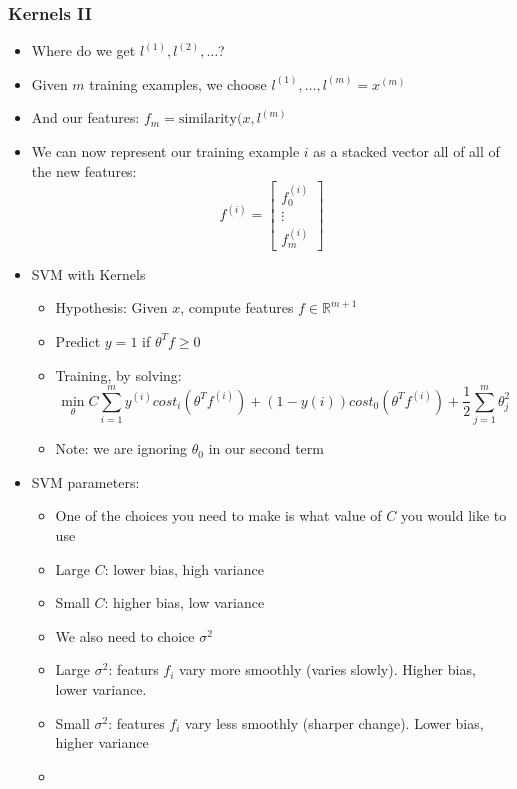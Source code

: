 \subsubsection{Kernels II}
\begin{itemize}[--]
	\item Where do we get $l^{(1)}, l^{(2)}, \ldots$?
	\item Given $m$ training examples, we choose $l^{(1)}, \ldots, l^{(m)}=x^{(m)}$
	\item And our features: $f_m=\text{similarity}(x, l^{(m)}$
	\item We can now represent our training example $i$ as a stacked vector all of all of the new features: 
		$$f^{(i)}=\begin{bmatrix}
			f_0^{(i)}\\
			\vdots \\
			f_m^{(i)}
		\end{bmatrix}$$

	\item SVM with Kernels
	\begin{itemize}[--]
		\item Hypothesis: Given $x$, compute features $f\in\mathbb{R}^{m+1}$
		\item Predict $y=1$ if $\theta^{T}f\geq 0$
		\item Training, by solving:
			$$\min_{\theta} C\sum_{i=1}^{m}y^{(i)}cost_i (\theta^{T}f^{(i)}) + (1-y{(i)})cost_0 (\theta^{T}f^{(i)}) + \frac{1}{2}\sum_{j=1}^{m}\theta_j^2$$
		\item Note: we are ignoring $\theta_0$ in our second term
	\end{itemize}

	\item SVM parameters:
	\begin{itemize}[--]
		\item One of the choices you need to make is what value of $C$ you would like to use
		\item Large $C$: lower bias, high variance
		\item Small $C$: higher bias, low variance
		\item We also need to choice $\sigma^2$
		\item Large $\sigma^2$: featurs $f_i$ vary more smoothly (varies slowly). Higher bias, lower variance.
		\item Small $\sigma^2$: features $f_i$ vary less smoothly (sharper change). Lower bias, higher variance
		\item 
	\end{itemize}
\end{itemize}

